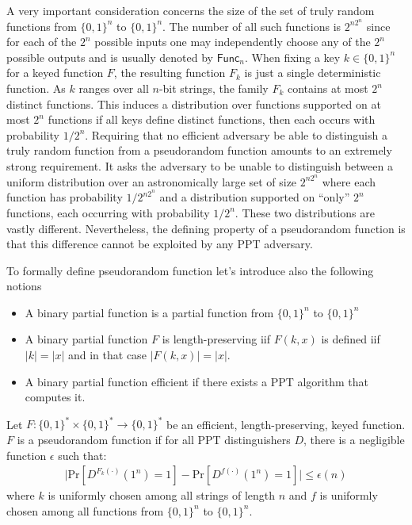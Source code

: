 A very important consideration concerns the size of the set of truly random functions from $\{0,1\}^n$ to $\{0,1\}^n$. The number of all such functions is $2^{n 2^n}$ since for each of the $2^n$ possible inputs one may independently choose any of the $2^n$ possible outputs and is usually denoted by $\mathsf{Func}_n$. When fixing a key $k \in \{0,1\}^n$ for a keyed function $F$, the resulting function $F_k$ is just a single deterministic function. As $k$ ranges over all $n$-bit strings, the family ${F_k}$ contains at most $2^n$ distinct functions. This induces a distribution over functions supported on at most $2^n$ functions if all keys define distinct functions, then each occurs with probability $1/2^n$. Requiring that no efficient adversary be able to distinguish a truly random function from a pseudorandom function amounts to an extremely strong requirement. It asks the adversary to be unable to distinguish between a uniform distribution over an astronomically large set of size $2^{n 2^n}$ where each function has probability $1/2^{n 2^n}$ and a distribution supported on \enquote{only} $2^n$ functions, each occurring with probability $1/2^n$. These two distributions are vastly different. Nevertheless, the defining property of a pseudorandom function is that this difference cannot be exploited by any PPT adversary.

To formally define pseudorandom function let's introduce also the following notions
\begin{itemize}
    \item A binary partial function is a partial function from $\{0,1\}^n$ to $\{0,1\}^n$
    \item A binary partial function $F$ is length-preserving iif $F(k,x)$ is defined iif $|k|= |x|$ and in that case $|F(k,x)| = |x|$.
    \item A binary partial function efficient if there exists a PPT algorithm that computes it.
\end{itemize}
\begin{definition}\label{def:prf}
Let $F: \{0, 1\}^* \times \{0, 1\}^* \to \{0, 1\}^*$ be an efficient, length-preserving, keyed function. $F$ is a pseudorandom function if for all PPT distinguishers $D$, there is a negligible function $\epsilon$ such that:
\begin{align}
\bigl| \mathrm{Pr}[D^{F_k(\cdot)}(1^n) = 1] - \mathrm{Pr}[D^{f(\cdot)}(1^n) = 1] \bigr| \leq \epsilon(n)
\end{align}
where $k$ is  uniformly chosen among all strings of length $n$ and $f$ is uniformly chosen among all functions from $\{0,1\}^n$ to $\{0,1\}^n$.
\end{definition}

